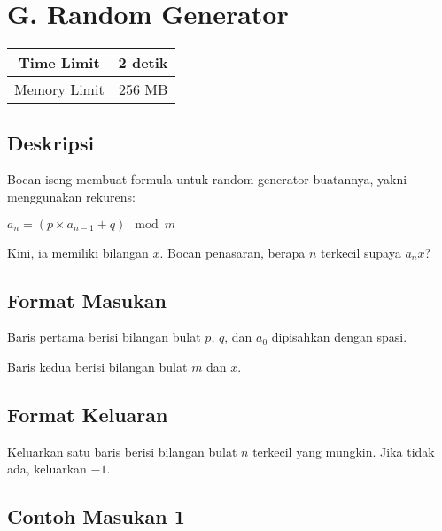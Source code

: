 \documentclass{article}
\begin{document}
\section*{\hfil G. Random Generator\hfil}

\begin{center}
\begin{tabular}{ |cc| } 
 \hline
 Time Limit & 2 detik \\
 \hline 
 Memory Limit & 256 MB \\
 \hline
\end{tabular}
\end{center}

\subsection*{Deskripsi}

\par\noindent Bocan iseng membuat formula untuk random generator buatannya, yakni menggunakan rekurens:

\begin{center}
$a_n = (p \times a_{n-1} + q) \mod m$
\end{center}

\par\noindent Kini, ia memiliki bilangan $x$. Bocan penasaran, berapa $n$ terkecil supaya $a_n  x$?

\subsection*{Format Masukan}

\par\noindent Baris pertama berisi bilangan bulat $p$, $q$, dan $a_0$ dipisahkan dengan spasi.
\par\noindent Baris kedua berisi bilangan bulat $m$ dan $x$.

\subsection*{Format Keluaran}

\par\noindent Keluarkan satu baris berisi bilangan bulat $n$ terkecil yang mungkin. Jika tidak ada, keluarkan $-1$.

\subsection*{Contoh Masukan 1}
\end{document}
